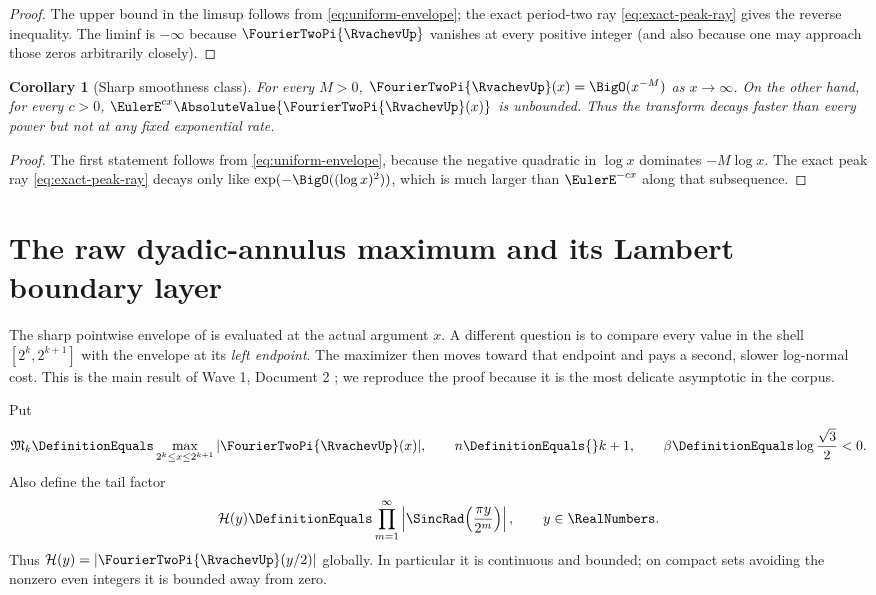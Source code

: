 \documentclass[11pt,oneside]{article}
\numberwithin{equation}{section}
\newtheorem{corollary}[theorem]{Corollary}
\theoremstyle{definition}
\theoremstyle{remark}
\begin{document}
\begin{proof}
The upper bound in the limsup follows from \eqref{eq:uniform-envelope}; the exact period-two
ray \eqref{eq:exact-peak-ray} gives the reverse inequality.  The liminf is $-\infty$ because
$\FourierTwoPi{\RvachevUp}$ vanishes at every positive integer (and also because one may approach those zeros
arbitrarily closely).
\end{proof}

\begin{corollary}[Sharp smoothness class]
\label{cor:superpoly-subexp}
For every $M>0$, $\FourierTwoPi{\RvachevUp}(x)=\BigO(x^{-M})$ as $x\to\infty$.  On the other hand, for every
$c>0$, $\EulerE^{cx}\AbsoluteValue{\FourierTwoPi{\RvachevUp}(x)}$ is unbounded.  Thus the transform decays faster than every
power but not at any fixed exponential rate.
\end{corollary}

\begin{proof}
The first statement follows from \eqref{eq:uniform-envelope}, because the negative
quadratic in $\log x$ dominates $-M\log x$.  The exact peak ray
\eqref{eq:exact-peak-ray} decays only like $\exp(-\BigO((\log x)^2))$, which is much larger
than $\EulerE^{-cx}$ along that subsequence.
\end{proof}


\section{The raw dyadic-annulus maximum and its Lambert boundary layer}
\label{sec:annular-maxima}

The sharp pointwise envelope of  is evaluated at the actual
argument $x$.  A different question is to compare every value in the shell
$[2^k,2^{k+1}]$ with the envelope at its \emph{left endpoint}.  The maximizer then moves
toward that endpoint and pays a second, slower log-normal cost.  This is the main result of
Wave 1, Document 2 \cite{wave1-doc2}; we reproduce the proof because it is the most delicate
asymptotic in the corpus.

Put
\begin{equation}
 \mathfrak M_k\DefinitionEquals\max_{2^k\le x\le2^{k+1}}|\FourierTwoPi{\RvachevUp}(x)|,
 \qquad n\DefinitionEquals{}k+1,
 \qquad \beta\DefinitionEquals\log\frac{\sqrt3}{2}<0.
 \label{eq:annular-M}
\end{equation}
Also define the tail factor
\[
 \mathcal H(y)\DefinitionEquals\prod_{m=1}^{\infty}\left|\SincRad\!\left(\frac{\pi y}{2^m}\right)\right|,
 \qquad y\in\RealNumbers.
\]
Thus $\mathcal H(y)=|\FourierTwoPi{\RvachevUp}(y/2)|$ globally.  In particular it is continuous and bounded;
on compact sets avoiding the nonzero even integers it is bounded away from zero.
\end{document}
